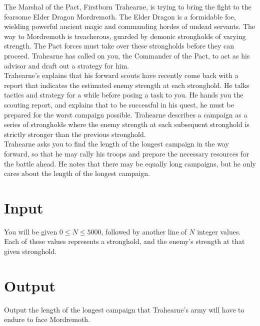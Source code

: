 
The Marshal of the Pact, Firstborn Trahearne, is trying to bring the fight to the fearsome Elder Dragon Mordremoth. The
Elder Dragon is a formidable foe, wielding powerful ancient magic and commanding hordes of undead servants. The way to
Mordremoth is treacherous, guarded by demonic strongholds of varying strength. The Pact forces must take over these
strongholds before they can proceed. Trahearne has called on you, the Commander of the Pact, to act as his advisor and
draft out a strategy for him. \\

Trahearne’s explains that his forward scouts have recently come back with a report that indicates the estimated enemy
strength at each stronghold. He talks tactics and strategy for a while before posing a task to you. He hands you the
scouting report, and explains that to be successful in his quest, he must be prepared for the worst campaign possible.
Trahearne describes a campaign as a series of strongholds where the enemy strength at each subsequent stronghold is
strictly stronger than the previous stronghold. \\

Trahearne asks you to find the length of the longest campaign in the way forward, so that he may rally his troops and
prepare the necessary resources for the battle ahead. He notes that there may be equally long campaigns, but he only
cares about the length of the longest campaign. \\


\section*{Input}
You will be given $0 \leq N \leq 5000$, followed by another line of $N$ integer values. Each of these values represents
a stronghold, and the enemy's strength at that given stronghold.
\section*{Output}
Output the length of the longest campaign that Trahearne’s army will have to endure to face Mordremoth. \\
